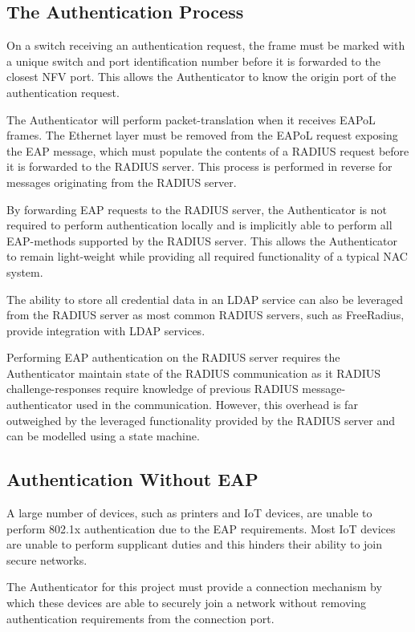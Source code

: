\subsection{The Authentication Process}
On a switch receiving an authentication request, the frame must be marked with a unique switch and port identification number before it is forwarded to the closest NFV port. This allows the Authenticator to know the origin port of the authentication request.

The Authenticator will perform packet-translation when it receives EAPoL frames. The Ethernet layer must be removed from the EAPoL request exposing the EAP message, which must populate the contents of a RADIUS request before it is forwarded to the RADIUS server. This process is performed in reverse for messages originating from the RADIUS server.

By forwarding EAP requests to the RADIUS server, the Authenticator is not required to perform authentication locally and is implicitly able to perform all EAP-methods supported by the RADIUS server. This allows the Authenticator to remain light-weight while providing all required functionality of a typical NAC system.

The ability to store all credential data in an LDAP service can also be leveraged from the RADIUS server as most common RADIUS servers, such as FreeRadius\cite{freeradius_modules}, provide integration with LDAP services.

Performing EAP authentication on the RADIUS server requires the Authenticator maintain state of the RADIUS communication as it RADIUS challenge-responses require knowledge of previous RADIUS message-authenticator used in the communication. However, this overhead is far outweighed by the leveraged functionality provided by the RADIUS server and can be modelled using a state machine.

\subsection{Authentication Without EAP}
A large number of devices, such as printers and IoT devices, are unable to perform 802.1x authentication due to the EAP requirements. Most IoT devices are unable to perform supplicant duties and this hinders their ability to join secure networks.

The Authenticator for this project must provide a connection mechanism by which these devices are able to securely join a network without removing authentication requirements from the connection port.

